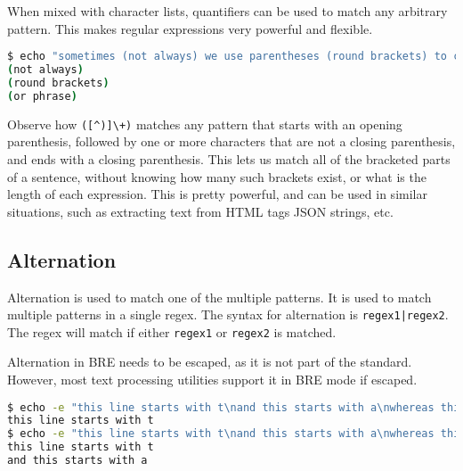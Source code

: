 When mixed with character lists, quantifiers can be used to match any arbitrary pattern. This makes regular expressions very powerful and flexible.

\begin{lstlisting}[language=bash]
$ echo "sometimes (not always) we use parentheses (round brackets) to clarify some part of a sentence (or phrase)." | grep "([^)]\+)" -o
(not always)
(round brackets)
(or phrase)
\end{lstlisting}

Observe how \lstinline|([^)]\+)| matches any pattern that starts with an opening parenthesis, followed by one or more characters that are not a closing parenthesis, and ends with a closing parenthesis. This lets us match all of the bracketed parts of a sentence, without knowing how many such brackets exist, or what is the length of each expression. This is pretty powerful, and can be used in similar situations, such as extracting text from HTML tags
JSON strings, etc.

\subsection{Alternation}

Alternation is used to match one of the multiple patterns. It is used to match multiple patterns in a single regex. The syntax for alternation is \lstinline:regex1|regex2:. The regex will match if either \lstinline|regex1| or \lstinline|regex2| is matched.

Alternation in BRE needs to be escaped, as it is not part of the standard. However, most text processing utilities support it in BRE mode if escaped.

\begin{lstlisting}[language=bash]
$ echo -e "this line starts with t\nand this starts with a\nwhereas this line starts with w" | grep '^t'
this line starts with t
$ echo -e "this line starts with t\nand this starts with a\nwhereas this line starts with w" | grep '^t\|^a'
this line starts with t
and this starts with a
\end{lstlisting}


